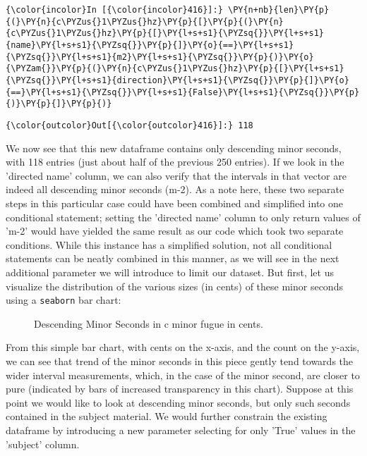     \begin{Verbatim}[commandchars=\\\{\}]
{\color{incolor}In [{\color{incolor}416}]:} \PY{n+nb}{len}\PY{p}{(}\PY{n}{c\PYZus{}1\PYZus{}hz}\PY{p}{[}\PY{p}{(}\PY{n}{c\PYZus{}1\PYZus{}hz}\PY{p}{[}\PY{l+s+s1}{\PYZsq{}}\PY{l+s+s1}{name}\PY{l+s+s1}{\PYZsq{}}\PY{p}{]}\PY{o}{==}\PY{l+s+s1}{\PYZsq{}}\PY{l+s+s1}{m2}\PY{l+s+s1}{\PYZsq{}}\PY{p}{)}\PY{o}{\PYZam{}}\PY{p}{(}\PY{n}{c\PYZus{}1\PYZus{}hz}\PY{p}{[}\PY{l+s+s1}{\PYZsq{}}\PY{l+s+s1}{direction}\PY{l+s+s1}{\PYZsq{}}\PY{p}{]}\PY{o}{==}\PY{l+s+s1}{\PYZsq{}}\PY{l+s+s1}{False}\PY{l+s+s1}{\PYZsq{}}\PY{p}{)}\PY{p}{]}\PY{p}{)}
\end{Verbatim}
\begin{Verbatim}[commandchars=\\\{\}]
{\color{outcolor}Out[{\color{outcolor}416}]:} 118
\end{Verbatim}
    We now see that this new dataframe contains only descending minor
seconds, with 118 entries (just about half of the previous 250 entries).
If we look in the 'directed name' column, we can also verify that the
intervals in that vector are indeed all descending minor seconds (m-2).
As a note here, these two separate steps in this particular case could
have been combined and simplified into one conditional statement;
setting the 'directed name' column to only return values of 'm-2' would
have yielded the same result as our code which took two separate
conditions. While this instance has a simplified solution, not all
conditional statements can be neatly combined in this manner, as we will
see in the next additional parameter we will introduce to limit our
dataset. But first, let us visualize the distribution of the various
sizes (in cents) of these minor seconds using a \texttt{seaborn} bar
chart:




\begin{figure}[H]
\vspace{1.5em}
    \centering
    \caption{ Descending Minor Seconds in c minor fugue in cents. }
\end{figure}    From this simple bar chart, with cents on the x-axis, and the count on
the y-axis, we can see that trend of the minor seconds in this piece
gently tend towards the wider interval measurements, which, in the case
of the minor second, are closer to pure (indicated by bars of increased
transparency in this chart). Suppose at this point we would like to look
at descending minor seconds, but only such seconds contained in the
subject material. We would further constrain the existing dataframe by
introducing a new parameter selecting for only 'True' values in the
'subject' column.

